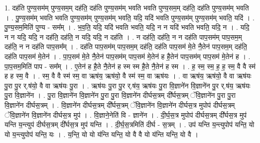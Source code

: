 \documentclass[17pt]{extarticle}
\begin{document}
1. दह॑ति पुण्य॒सम॑म् पुण्य॒सम॒म् दह॑ति॒ दह॑ति पुण्य॒सम॑म् भवति भवति पुण्य॒सम॒म् दह॑ति॒ दह॑ति पुण्य॒सम॑म् भवति । . पु॒ण्य॒सम॑म् भवति भवति पुण्य॒सम॑म् पुण्य॒सम॑म् भवति॒ यदि॒ यदि॑ भवति पुण्य॒सम॑म् पुण्य॒सम॑म् भवति॒ यदि॑ । . पु॒ण्य॒सम॒मिति॑ पुण्य - सम᳚म् । . भ॒व॒ति॒ यदि॒ यदि॑ भवति भवति॒ यदि॒ न न यदि॑ भवति भवति॒ यदि॒ न । . यदि॒ न न यदि॒ यदि॒ न दह॑ति॒ दह॑ति॒ न यदि॒ यदि॒ न दह॑ति । . न दह॑ति॒ दह॑ति॒ न न दह॑ति पाप॒सम॑म् पाप॒सम॒म् दह॑ति॒ न न दह॑ति पाप॒सम᳚म् । . दह॑ति पाप॒सम॑म् पाप॒सम॒म् दह॑ति॒ दह॑ति पाप॒सम॑ मे॒ते नै॒तेन॑ पाप॒सम॒म् दह॑ति॒ दह॑ति पाप॒सम॑ मे॒तेन॑ । . पा॒प॒सम॑ मे॒ते नै॒तेन॑ पाप॒सम॑म् पाप॒सम॑ मे॒तेन॑ ह है॒तेन॑ पाप॒सम॑म् पाप॒सम॑ मे॒तेन॑ ह । . पा॒प॒सम॒मिति॑ पाप - सम᳚म् । . ए॒तेन॑ ह है॒ते नै॒तेन॑ ह स्म स्म है॒ते नै॒तेन॑ ह स्म । . ह॒ स्म॒ स्म॒ ह॒ ह॒ स्म॒ वै वै स्म॑ ह ह स्म॒ वै । . स्म॒ वै वै स्म॑ स्म॒ वा ऋष॑य॒ ऋष॑यो॒ वै स्म॑ स्म॒ वा ऋष॑यः । . वा ऋष॑य॒ ऋष॑यो॒ वै वा ऋष॑यः पु॒रा पु॒र र्.ष॑यो॒ वै वा ऋष॑यः पु॒रा । . ऋष॑यः पु॒रा पु॒र र्.ष॑य॒ ऋष॑यः पु॒रा वि॒ज्ञाने॑न वि॒ज्ञाने॑न पु॒र र्.ष॑य॒ ऋष॑यः पु॒रा वि॒ज्ञाने॑न । . पु॒रा वि॒ज्ञाने॑न वि॒ज्ञाने॑न पु॒रा पु॒रा वि॒ज्ञाने॑न दीर्घस॒त्रम् दी᳚र्घस॒त्रम् ॅवि॒ज्ञाने॑न पु॒रा पु॒रा वि॒ज्ञाने॑न दीर्घस॒त्रम् । . वि॒ज्ञाने॑न दीर्घस॒त्रम् दी᳚र्घस॒त्रम् ॅवि॒ज्ञाने॑न वि॒ज्ञाने॑न दीर्घस॒त्र मुपोप॑ दीर्घस॒त्रम् ॅवि॒ज्ञाने॑न वि॒ज्ञाने॑न दीर्घस॒त्र मुप॑ । . वि॒ज्ञाने॒नेति॑ वि - ज्ञाने॑न । . दी॒र्घ॒स॒त्र मुपोप॑ दीर्घस॒त्रम् दी᳚र्घस॒त्र मुप॑ यन्ति य॒न्त्युप॑ दीर्घस॒त्रम् दी᳚र्घस॒त्र मुप॑ यन्ति । . दी॒र्घ॒स॒त्रमिति॑ दीर्घ - स॒त्रम् । . उप॑ यन्ति य॒न्त्युपोप॑ यन्ति॒ यो यो य॒न्त्युपोप॑ यन्ति॒ यः । . य॒न्ति॒ यो यो य॑न्ति यन्ति॒ यो वै वै यो य॑न्ति यन्ति॒ यो वै । \newline
\end{document}
